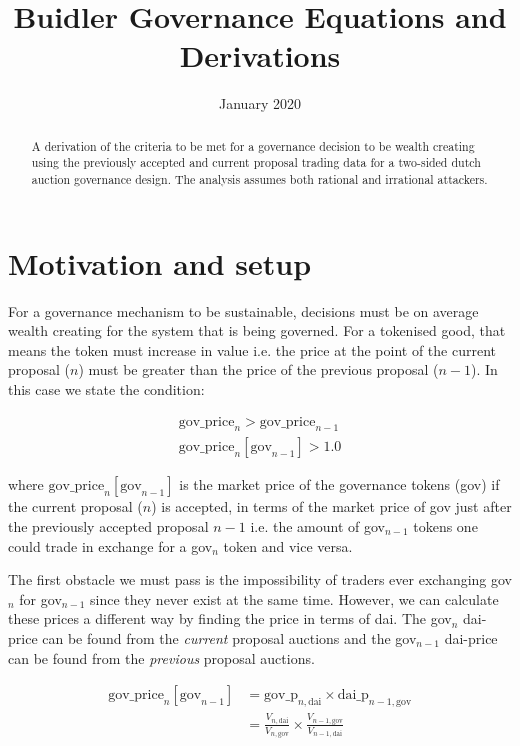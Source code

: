 \documentclass{article}
\title{Buidler Governance Equations and Derivations}
\date{January 2020}
\begin{document}
\maketitle

\begin{abstract}
    A derivation of the criteria to be met for a governance decision to be wealth creating using the previously accepted and current proposal trading data for a two-sided dutch auction governance design. The analysis assumes both rational and irrational attackers.
\end{abstract}

\section{Motivation and setup}
For a governance mechanism to be sustainable, decisions must be on average wealth creating for the system that is being governed. For a tokenised good, that means the token must increase in value i.e. the price at the point of the current proposal ($n$) must be greater than the price of the previous proposal ($n-1$). In this case we state the condition:

\begin{align}
    \mathrm{gov\_price}_{n} > \mathrm{gov\_price}_{n-1}\\
    \mathrm{gov\_price}_{n}[\mathrm{gov}_{n-1}] > 1.0
\end{align}

where $\mathrm{gov\_price}_{n}[\mathrm{gov}_{n-1}]$ is the market price of the governance tokens (gov) if the current proposal ($n$) is accepted, in terms of the market price of gov just after the previously accepted proposal $n-1$ i.e. the amount of gov$_{n-1}$ tokens one could trade in exchange for a gov$_n$ token and vice versa.


The first obstacle we must pass is the impossibility of traders ever exchanging gov$_n$ for gov$_{n-1}$ since they never exist at the same time. However, we can calculate these prices a different way by finding the price in terms of dai. The gov$_n$ dai-price can be found from the \emph{current} proposal auctions and the gov$_{n-1}$ dai-price can be found from the \emph{previous} proposal auctions.


\begin{align}
    \mathrm{gov\_price}_{n}[\mathrm{gov}_{n-1}] &= \mathrm{gov\_p}_{n,\mathrm{dai}} \times \mathrm{dai\_p}_{n-1,\mathrm{gov}} \label{eqn:proposal_price}\\ 
           &= \frac{V_{n,\mathrm{dai}}}{V_{n,\mathrm{gov}}} \times \frac{V_{n-1,\mathrm{gov}}}{V_{n-1,\mathrm{dai}}}
\end{align}
\end{document}
